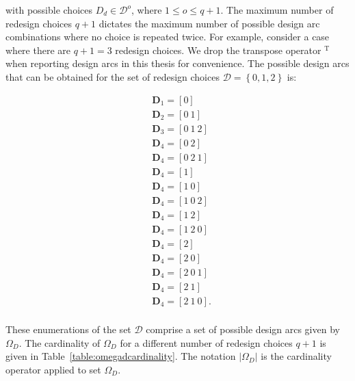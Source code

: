 with possible choices $D_d \in \mathcal{D}^o$, where $1 \leq o \leq q+1$. The maximum number of redesign choices $q + 1$ dictates the maximum number of possible design arc combinations where no choice is repeated twice. For example, consider a case where there are $q + 1 = 3$ redesign choices. We drop the transpose operator $^{\mathrm{T}}$ when reporting design arcs in this thesis for convenience. The possible design arcs that can be obtained for the set of redesign choices $\mathcal{D} = \left\{0,1,2\right\}$ is:

\begin{equation*}
	\begin{aligned}
		& \mathbf{D}_1 = \left[0\right]\\
		& \mathbf{D}_2 = \left[0 ~ 1\right]\\
		& \mathbf{D}_3 = \left[0 ~ 1 ~ 2\right]\\
		& \mathbf{D}_4 = \left[0 ~ 2\right]\\
		& \mathbf{D}_4 = \left[0 ~ 2 ~ 1\right]\\
		& \mathbf{D}_4 = \left[1\right]\\
		& \mathbf{D}_4 = \left[1 ~ 0\right]\\
		& \mathbf{D}_4 = \left[1 ~ 0 ~ 2\right]\\
		& \mathbf{D}_4 = \left[1 ~ 2\right]\\
		& \mathbf{D}_4 = \left[1 ~ 2 ~ 0\right]\\
		& \mathbf{D}_4 = \left[2\right]\\
		& \mathbf{D}_4 = \left[2 ~ 0\right]\\
		& \mathbf{D}_4 = \left[2 ~ 0 ~ 1\right]\\
		& \mathbf{D}_4 = \left[2 ~ 1\right]\\
		& \mathbf{D}_4 = \left[2 ~ 1 ~ 0\right].\\
	\end{aligned}
\end{equation*}

These enumerations of the set $\mathcal{D}$ comprise a set of possible design arcs given by $\Omega_D$. The cardinality of $\Omega_D$ for a different number of redesign choices $q+1$ is given in Table~\ref{table:omegadcardinality}. The notation $|\Omega_D|$ is the cardinality operator applied to set $\Omega_D$.

